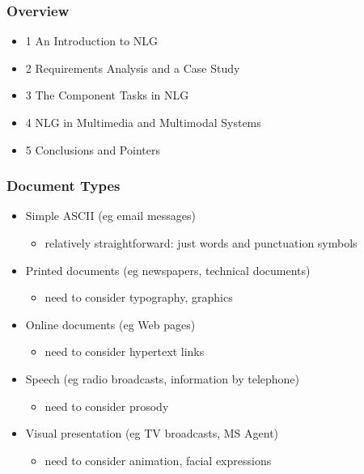 \documentclass[compress,color=usenames]{beamer}
\begin{document}
\begin{frame}
\frametitle{
Overview}

\label{f69}
\begin{itemize}
\item {{1                An Introduction to NLG}}
\item {{2                Requirements Analysis and a Case Study}}
\item {{3                The Component Tasks in NLG}}
\item {{4                NLG in Multimedia and Multimodal Systems}}
\item {{5                Conclusions and Pointers}}
\end{itemize}
 
\end{frame}

\begin{frame}
\frametitle{
Document Types}

\label{f71}
\begin{itemize}
\item {{Simple ASCII (eg email messages)}}
\begin{itemize}
\item relatively straightforward: just words and punctuation symbols
\end{itemize}
\item {{Printed documents (eg newspapers, technical documents)}}
\begin{itemize}
\item need to consider typography, graphics
\end{itemize}
\item {{Online documents (eg Web pages)}}
\begin{itemize}
\item need to consider hypertext links
\end{itemize}
\item {{Speech (eg radio broadcasts, information by telephone)}}
\begin{itemize}
\item need to consider prosody
\end{itemize}
\item {{Visual presentation (eg TV broadcasts, MS Agent)}}
\begin{itemize}
\item need to consider animation, facial expressions
\end{itemize}
\end{itemize}
 
\end{frame}
\end{document}
